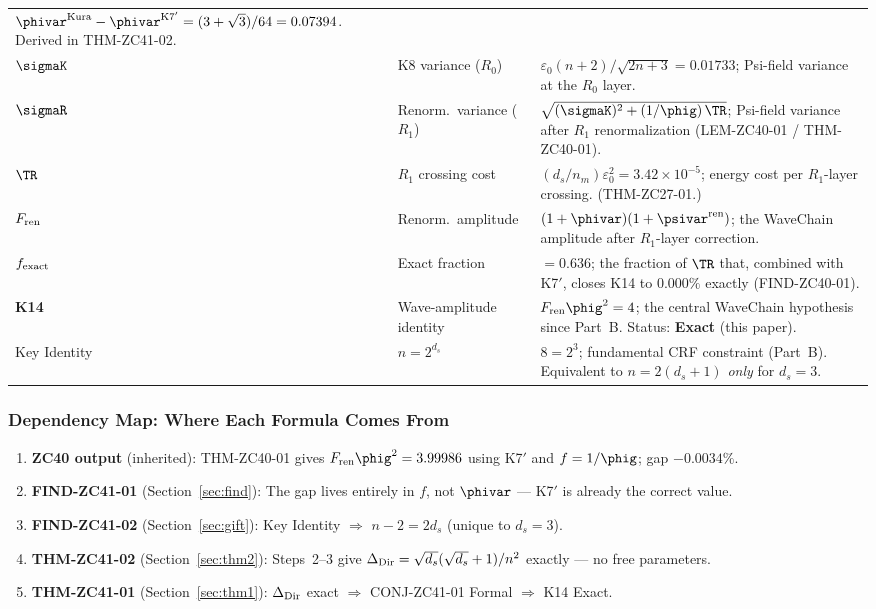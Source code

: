 \documentclass[12pt, a4paper]{article}
\begin{document}
{\begin{longtable}{>{\raggedright\arraybackslash}p{2.8cm}
                  >{\raggedright\arraybackslash}p{3.4cm}
                  >{\raggedright\arraybackslash}p{7.5cm}}
  $\phivar^{\rm Kura} - \phivar^{\rm K7'} = (3+\sqrt{3})/64
  = 0.07394$. Derived in THM-ZC41-02. \\[3pt]
$\sigmaK$ & K8 variance ($R_0$) &
  $\varepsilon_0(n+2)/\sqrt{2n+3} = 0.01733$;
  Psi-field variance at the $R_0$ layer. \\[3pt]
$\sigmaR$ & Renorm.\ variance ($R_1$) &
  $\sqrt{(\sigmaK)^2 + (1/\phig)\,\TR}$;
  Psi-field variance after $R_1$ renormalization
  (LEM-ZC40-01 / THM-ZC40-01). \\[3pt]
$\TR$ & $R_1$ crossing cost &
  $(d_s/n_m)\varepsilon_0^2 = 3.42\times10^{-5}$;
  energy cost per $R_1$-layer crossing. (THM-ZC27-01.) \\[3pt]
$F_{\rm ren}$ & Renorm.\ amplitude &
  $(1+\phivar)(1+\psivar^{\rm ren})$; the WaveChain amplitude
  after $R_1$-layer correction. \\[3pt]
$f_{\rm exact}$ & Exact fraction &
  $= 0.636$; the fraction of $\TR$ that, combined with K7$'$,
  closes K14 to $0.000\%$ exactly (FIND-ZC40-01). \\[3pt]
\textbf{K14} & Wave-amplitude identity &
  $F_{\rm ren}\phig^2 = 4$; the central WaveChain hypothesis
  since Part~B. Status: \textbf{Exact} (this paper). \\[3pt]
Key Identity & $n = 2^{d_s}$ &
  $8 = 2^3$; fundamental CRF constraint (Part~B).
  Equivalent to $n = 2(d_s+1)$ \emph{only} for $d_s = 3$. \\
\end{longtable}
}

\subsubsection*{Dependency Map: Where Each Formula Comes From}

\begin{derivedbox}[title={Logic Flow of This Paper}]
\begin{enumerate}[leftmargin=2em, noitemsep]
  \item \textbf{ZC40 output} (inherited):
    THM-ZC40-01 gives $F_{\rm ren}\phig^2 = 3.99986$ using K7$'$
    and $f = 1/\phig$; gap $-0.0034\%$.
  \item \textbf{FIND-ZC41-01} (Section~\ref{sec:find}):
    The gap lives entirely in $f$, not $\phivar$ ---
    K7$'$ is already the correct value.
  \item \textbf{FIND-ZC41-02} (Section~\ref{sec:gift}):
    Key Identity $\Rightarrow$ $n-2 = 2d_s$ (unique to $d_s=3$).
  \item \textbf{THM-ZC41-02} (Section~\ref{sec:thm2}):
    Steps~2--3 give $\Delta_{\rm Dir} = \sqrt{d_s}(\sqrt{d_s}+1)/n^2$
    exactly --- no free parameters.
  \item \textbf{THM-ZC41-01} (Section~\ref{sec:thm1}):
    $\Delta_{\rm Dir}$ exact $\Rightarrow$ CONJ-ZC41-01 Formal
    $\Rightarrow$ K14 Exact.
\end{enumerate}
\end{derivedbox}
\end{document}
